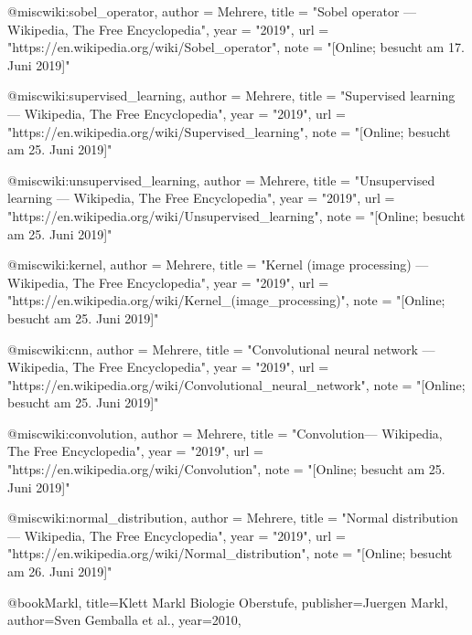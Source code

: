 @misc{wiki:sobel_operator,
  author = {{Mehrere}},
  title = "Sobel operator --- {W}ikipedia{,} The Free Encyclopedia",
  year = "2019",
  url = "https://en.wikipedia.org/wiki/Sobel_operator",
  note = "[Online; besucht am 17. Juni 2019]"
}

@misc{wiki:supervised_learning,
  author = {{Mehrere}},
  title = "Supervised learning --- {W}ikipedia{,} The Free Encyclopedia",
  year = "2019",
  url = "https://en.wikipedia.org/wiki/Supervised_learning",
  note = "[Online; besucht am 25. Juni 2019]"
}

@misc{wiki:unsupervised_learning,
  author = {{Mehrere}},
  title = "Unsupervised learning --- {W}ikipedia{,} The Free Encyclopedia",
  year = "2019",
  url = "https://en.wikipedia.org/wiki/Unsupervised_learning",
  note = "[Online; besucht am 25. Juni 2019]"
}

@misc{wiki:kernel,
  author = {{Mehrere}},
  title = "Kernel (image processing) --- {W}ikipedia{,} The Free Encyclopedia",
  year = "2019",
  url = "https://en.wikipedia.org/wiki/Kernel_(image_processing)",
  note = "[Online; besucht am 25. Juni 2019]"
}

@misc{wiki:cnn,
  author = {{Mehrere}},
  title = "Convolutional neural network --- {W}ikipedia{,} The Free Encyclopedia",
  year = "2019",
  url = "https://en.wikipedia.org/wiki/Convolutional_neural_network",
  note = "[Online; besucht am 25. Juni 2019]"
}

@misc{wiki:convolution,
  author = {{Mehrere}},
  title = "Convolution--- {W}ikipedia{,} The Free Encyclopedia",
  year = "2019",
  url = "https://en.wikipedia.org/wiki/Convolution",
  note = "[Online; besucht am 25. Juni 2019]"
}

@misc{wiki:normal_distribution,
  author = {{Mehrere}},
  title = "Normal distribution --- {W}ikipedia{,} The Free Encyclopedia",
  year = "2019",
  url = "https://en.wikipedia.org/wiki/Normal_distribution",
  note = "[Online; besucht am 26. Juni 2019]"
}

@book{Markl,
    title={Klett Markl Biologie Oberstufe},
    publisher={Juergen Markl},
    author={Sven Gemballa et al.},
    year={2010},
}